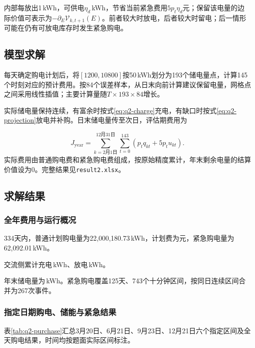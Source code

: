 内部每放出1\,kWh，可供电$\eta_d$\,kWh，节省当前紧急费用$5p_t\eta_d$元；保留该电量的边际价值可表示为$-\partial_E\mathcal V_{k,t+1}(E)$。前者较大时放电，后者较大时留电；后一情形可能在仍有可放电库存时发生紧急购电。

\subsection{模型求解}

每天确定购电计划后，将$[1200,10800]$按50\,kWh划分为193个储电量点，计算145个时刻对应的预计费用。按84个误差样本，从日末向前计算建议保留电量，网格点之间采用线性插值；主要计算量随$T\times193\times84$增长。

实际储电量保持连续，有富余时按式\eqref{eq:q2-charge}充电，有缺口时按式\eqref{eq:q2-projection}放电并补购。日末储电量传至次日，评估期费用为

\begin{equation}
    J_{\mathrm{year}}=
    \sum_{k=\text{2月1日}}^{\text{12月31日}}
    \sum_{t=0}^{143}(p_tq_{kt}+5p_tu_{kt}).
    \label{eq:q2-annual-cost}
\end{equation}
实际费用由普通购电费和紧急购电费组成，按原始精度累计，年末剩余电量的结算价值设为0。完整结果见\texttt{result2.xlsx}。

\subsection{求解结果}

\subsubsection{全年费用与运行概况}

334天内，普通计划购电量为22,000,180.73\,kWh，计划费为\QtwoPlanCost 元，紧急购电量为62,092.01\,kWh。

交流侧累计充电\QtwoCharge\,kWh、放电\QtwoDischarge\,kWh。

年末储电量为\QtwoEnd\,kWh。紧急购电覆盖125天、743个十分钟区间，按同日连续区间合并为267次事件。

\subsubsection{指定日期购电、储能与紧急结果}

表\ref{tab:q2-purchase}汇总3月20日、6月21日、9月23日、12月21日六个指定区间及全天购电结果，时间均按题面实际区间标注。

\begin{table}[H]
    \centering\small
    \caption{指定日期计划购电量及全天费用（区间电量单位：kWh）}
    \label{tab:q2-purchase}
    \renewcommand{\arraystretch}{1.15}
    
\end{table}

